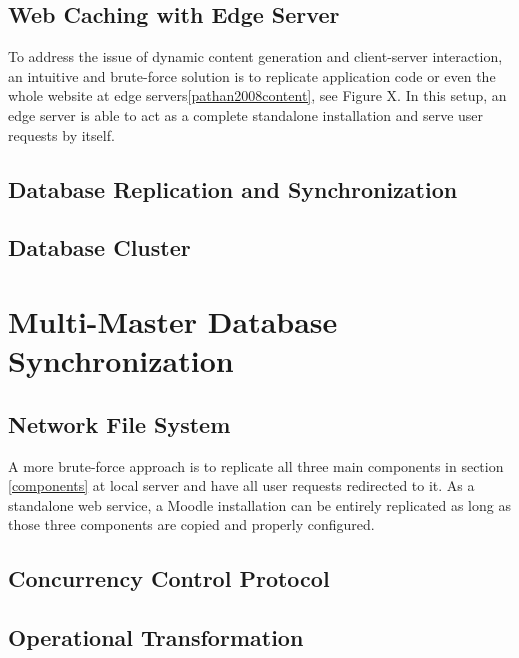 
\subsection{Web Caching with Edge Server}
To address the issue of dynamic content generation and client-server interaction, an intuitive and brute-force solution is to replicate application code or even the whole website at edge servers\ref{pathan2008content}, see Figure X. In this setup, an edge server is able to act as a complete standalone installation and serve user requests by itself. 



\subsection{Database Replication and Synchronization}

\subsection{Database Cluster}

\section{Multi-Master Database Synchronization}

\subsection{Network File System}
A more brute-force approach is to replicate all three main components in section \ref{components} at local server and have all user requests redirected to it. As a standalone web service, a Moodle installation can be entirely replicated as long as those three components are copied and properly configured.
\subsection{Concurrency Control Protocol}

\subsection{Operational Transformation}

